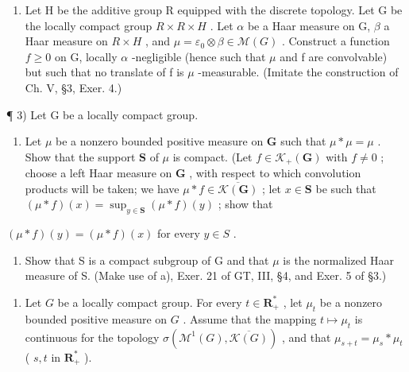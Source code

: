 \begin{enumerate}
\def\labelenumi{\arabic{enumi})}
\setcounter{enumi}{1}
\tightlist
\item
  Let H be the additive group R equipped with the discrete topology. Let G be the locally compact group \(R \times R \times H\) . Let \(\alpha\) be a Haar measure on G, \(\beta\) a Haar measure on \(R \times H\) , and \(\mu = \varepsilon_{0} \otimes \beta \in \mathcal{M}(G)\) . Construct a function \(f \geqslant 0\) on G, locally \(\alpha\) -negligible (hence such that \(\mu\) and f are convolvable) but such that no translate of f is \(\mu\) -measurable. (Imitate the construction of Ch. V, §3, Exer. 4.)
\end{enumerate}

¶ 3) Let G be a locally compact group.

\begin{enumerate}
\def\labelenumi{\alph{enumi})}
\tightlist
\item
  Let \(\mu\) be a nonzero bounded positive measure on \(\mathbf{G}\) such that \(\mu * \mu = \mu\) . Show that the support \(\mathbf{S}\) of \(\mu\) is compact. (Let \(f \in \mathcal{K}_{+}(\mathbf{G})\) with \(f \neq 0\) ; choose a left Haar measure on \(\mathbf{G}\) , with respect to which convolution products will be taken; we have \(\mu * f \in \overline{\mathcal{K}(\mathbf{G})}\) ; let \(x \in \mathbf{S}\) be such that \((\mu * f)(x) = \sup_{y \in \mathbf{S}} (\mu * f)(y)\) ; show that
\end{enumerate}

\((\mu * f)(y) = (\mu * f)(x)\) for every \(y \in S\) .

\begin{enumerate}
\def\labelenumi{\alph{enumi})}
\setcounter{enumi}{1}
\tightlist
\item
  Show that S is a compact subgroup of G and that \(\mu\) is the normalized Haar measure of S. (Make use of a), Exer. 21 of GT, III, §4, and Exer. 5 of §3.)
\end{enumerate}

\begin{enumerate}
\def\labelenumi{\arabic{enumi})}
\setcounter{enumi}{3}
\tightlist
\item
  Let \(G\) be a locally compact group. For every \(t \in \mathbf{R}_+^*\) , let \(\mu_t\) be a nonzero bounded positive measure on \(G\) . Assume that the mapping \(t \mapsto \mu_t\) is continuous for the topology \(\sigma(\mathcal{M}^1(G), \overline{\mathcal{K}(G)})\) , and that \(\mu_{s+t} = \mu_s * \mu_t\) ( \(s, t\) in \(\mathbf{R}_+^*\) ).
\end{enumerate}

